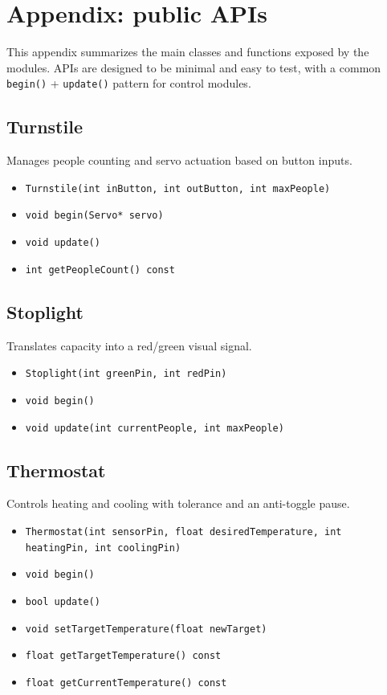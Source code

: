 \chapter{Appendix: public APIs}

This appendix summarizes the main classes and functions exposed by the modules. APIs are designed to be minimal and easy to test, with a common \texttt{begin()} + \texttt{update()} pattern for control modules.

\section{Turnstile}
Manages people counting and servo actuation based on button inputs.
\begin{itemize}
  \item \texttt{Turnstile(int inButton, int outButton, int maxPeople)}
  \item \texttt{void begin(Servo* servo)}
  \item \texttt{void update()}
  \item \texttt{int getPeopleCount() const}
\end{itemize}

\section{Stoplight}
Translates capacity into a red/green visual signal.
\begin{itemize}
  \item \texttt{Stoplight(int greenPin, int redPin)}
  \item \texttt{void begin()}
  \item \texttt{void update(int currentPeople, int maxPeople)}
\end{itemize}

\section{Thermostat}
Controls heating and cooling with tolerance and an anti-toggle pause.
\begin{itemize}
  \item \texttt{Thermostat(int sensorPin, float desiredTemperature, int}\\
        \texttt{heatingPin, int coolingPin)}
  \item \texttt{void begin()}
  \item \texttt{bool update()}
  \item \texttt{void setTargetTemperature(float newTarget)}
  \item \texttt{float getTargetTemperature() const}
  \item \texttt{float getCurrentTemperature() const}
\end{itemize}

